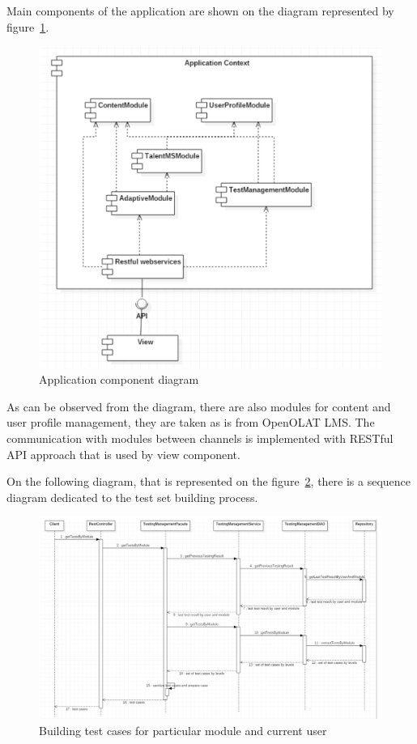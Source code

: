 \documentclass[a4paper,14pt,oneside,final]{extarticle}
\begin{document}
Main components of the application are shown on the diagram represented by figure~\ref{fig:5}.

\begin{figure}[H]
    \centering
    \includegraphics[width=1\textwidth]{fig5}
    \caption{Application component diagram}
    \label{fig:5}
\end{figure}

As can be observed from the diagram, there are also modules for content and user profile management, they are taken as is from OpenOLAT LMS. The communication with modules between channels is implemented with RESTful API approach that is used by view component. 

On the following diagram, that is represented on the figure~\ref{fig:6}, there is a sequence diagram dedicated to the test set building process. 

\begin{figure}[H]
    \centering
    \includegraphics[width=1\textwidth]{fig6}
    \caption{Building test cases for particular module and current user}
    \label{fig:6}
\end{figure}
\end{document}
